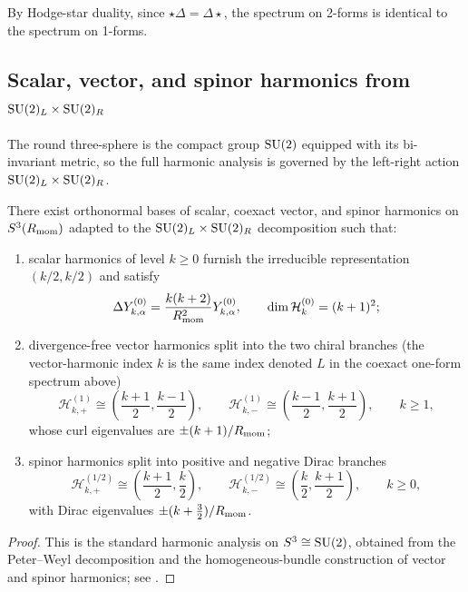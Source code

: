 \documentclass[11pt]{article}
\begin{document}
By Hodge-star duality, since \(\star\Delta=\Delta\star\), the spectrum on 2-forms is identical to the spectrum on 1-forms.


\subsection{Scalar, vector, and spinor harmonics from \texorpdfstring{\(\mathrm{SU}(2)_L\times \mathrm{SU}(2)_R\)}{SU(2)L x SU(2)R}}
\label{p1:subsec:s3-harmonic-package}

The round three-sphere is the compact group \(\mathrm{SU}(2)\) equipped with its bi-invariant metric, so the full harmonic analysis is governed by the left-right action \(\mathrm{SU}(2)_L\times \mathrm{SU}(2)_R\).

\begin{theorem}
\label{p1:thm:representation-harmonic-package}
There exist orthonormal bases of scalar, coexact vector, and spinor harmonics on \(S^3(R_{\mathrm{mom}})\) adapted to the \(\mathrm{SU}(2)_L\times \mathrm{SU}(2)_R\) decomposition such that:
\begin{enumerate}[label=(\roman*)]
\item scalar harmonics of level \(k\ge0\) furnish the irreducible representation \((k/2,k/2)\) and satisfy
\[
\Delta Y^{(0)}_{k,\alpha}=\frac{k(k+2)}{R_{\mathrm{mom}}^2}Y^{(0)}_{k,\alpha},
\qquad
\dim \mathcal H_k^{(0)}=(k+1)^2;
\]
\item divergence-free vector harmonics split into the two chiral branches (the vector-harmonic index \(k\) is the same index denoted \(L\) in the coexact one-form spectrum above)
\[
\mathcal H_{k,+}^{(1)}\cong \left(\frac{k+1}{2},\frac{k-1}{2}\right),
\qquad
\mathcal H_{k,-}^{(1)}\cong \left(\frac{k-1}{2},\frac{k+1}{2}\right),
\qquad k\ge1,
\]
whose curl eigenvalues are \(\pm (k+1)/R_{\mathrm{mom}}\);
\item spinor harmonics split into positive and negative Dirac branches
\[
\mathcal H_{k,+}^{(1/2)}\cong \left(\frac{k+1}{2},\frac{k}{2}\right),
\qquad
\mathcal H_{k,-}^{(1/2)}\cong \left(\frac{k}{2},\frac{k+1}{2}\right),
\qquad k\ge0,
\]
with Dirac eigenvalues \(\pm (k+\tfrac32)/R_{\mathrm{mom}}\).
\end{enumerate}
\end{theorem}

\begin{proof}
This is the standard harmonic analysis on \(S^3\cong \mathrm{SU}(2)\), obtained from the Peter--Weyl decomposition and the homogeneous-bundle construction of vector and spinor harmonics; see \cite{Camporesi1991,ishikiTakayamaTsuchiya2006S3}.
\end{proof}
\end{document}
